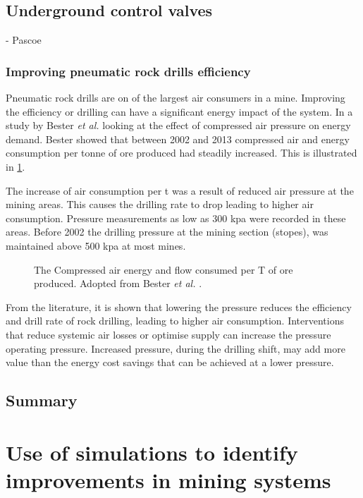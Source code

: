 		 \subsection{Underground control valves}
		 - Pascoe
		 
		\subsubsection{Improving pneumatic rock drills efficiency}
		 Pneumatic rock drills are on of the largest air consumers in a mine. Improving the efficiency or drilling can have a significant energy impact of the system. In a study by  Bester \textit{et al.} \cite{bester2013effect} looking at the effect of compressed air pressure on energy demand. Bester showed that between 2002 and 2013 compressed air and energy consumption per tonne of ore produced had steadily increased. This is illustrated  in \cref{fig: Compressed energy and air flow per ton}. 
		 \par 
		 The increase of air consumption per \gls{t} was a result of reduced air pressure at the mining areas. This causes the drilling rate to drop leading to higher air consumption. Pressure measurements as low as 300 \gls{kpa} were recorded in these areas. Before 2002 the drilling pressure at the mining section (stopes), was maintained above 500 \gls{kpa} at most mines. 
		 \par 
		 \begin{figure}[h]
		 	\centering
		 	
		 	\caption[The Compressed air energy and flow consumed per T of ore produced.]{The Compressed air energy and flow consumed per T of ore produced. Adopted from Bester \textit{et al.} \cite{bester2013effect}.}
		 	\label{fig: Compressed energy and air flow per ton}
		 \end{figure}
		 From the literature, it is shown that lowering the pressure reduces the efficiency and drill rate of rock drilling, leading to higher air consumption. Interventions that reduce systemic air losses or optimise supply can increase the pressure operating pressure. Increased pressure, during the drilling shift, may add more value than the energy cost savings that can be achieved at a lower pressure.
	\subsection{Summary}
\clearpage

\section{Use of simulations to identify improvements in mining systems}
